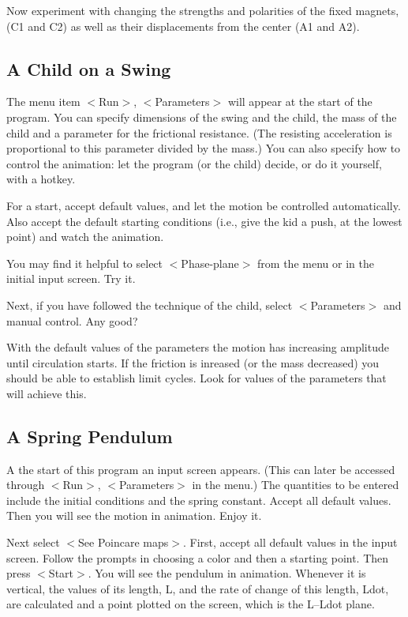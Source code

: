    Now experiment with changing the strengths and polarities of the
fixed magnets, (C1 and C2) as well as their displacements from the
center (A1 and A2).



\subsection{A Child on a Swing}

   The menu item $<$Run$>$, $<$Parameters$>$ will appear at the start of the
program. You can specify dimensions of the swing and the child, the mass
of the child and a parameter for the frictional resistance. (The resisting
acceleration is proportional to this parameter divided by the mass.) You
can also specify how to control the animation: let the program (or the
child) decide, or do it yourself, with a hotkey.

   For a start, accept default values, and let the motion be controlled
automatically. Also accept the default starting conditions (i.e., give
the kid a push, at the lowest point) and watch the animation.

   You may find it helpful to select $<$Phase-plane$>$ from the menu or in
the initial input screen. Try it.

   Next, if you have followed the technique of the child, select
$<$Parameters$>$ and manual control. Any good?

   With the default values of the parameters the motion has increasing
amplitude until circulation starts. If the friction is inreased (or
the mass decreased) you should be able to establish limit cycles. Look
for values of the parameters that will achieve this.



\subsection{A Spring Pendulum}

   A the start of this program an input screen appears. (This can
later be accessed through $<$Run$>$, $<$Parameters$>$ in the menu.) The
quantities to be entered include the initial conditions and the
spring constant. Accept all default values. Then you will see
the motion in animation. Enjoy it.

   Next select $<$See Poincare maps$>$. First, accept all default values
in the input screen. Follow the prompts in choosing a color and then a
starting point. Then press $<$Start$>$. You will see the pendulum in
animation. Whenever it is vertical, the values of its length, L, and
the rate of change of this length, Ldot, are calculated and a point
plotted on the screen, which is the L--Ldot plane.


